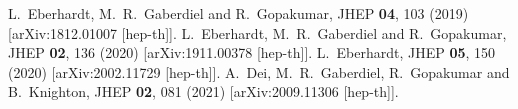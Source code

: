 \documentclass[11pt]{article}
\begin{document}
\begin{thebibliography}{99}
L.~Eberhardt, M.~R.~Gaberdiel and R.~Gopakumar,
JHEP \textbf{04}, 103 (2019)
[arXiv:1812.01007 [hep-th]].
L.~Eberhardt, M.~R.~Gaberdiel and R.~Gopakumar,
JHEP \textbf{02}, 136 (2020)
[arXiv:1911.00378 [hep-th]].
L.~Eberhardt,
JHEP \textbf{05}, 150 (2020)
[arXiv:2002.11729 [hep-th]].
A.~Dei, M.~R.~Gaberdiel, R.~Gopakumar and B.~Knighton,
JHEP \textbf{02}, 081 (2021)
[arXiv:2009.11306 [hep-th]].











\end{thebibliography}
\end{document}
